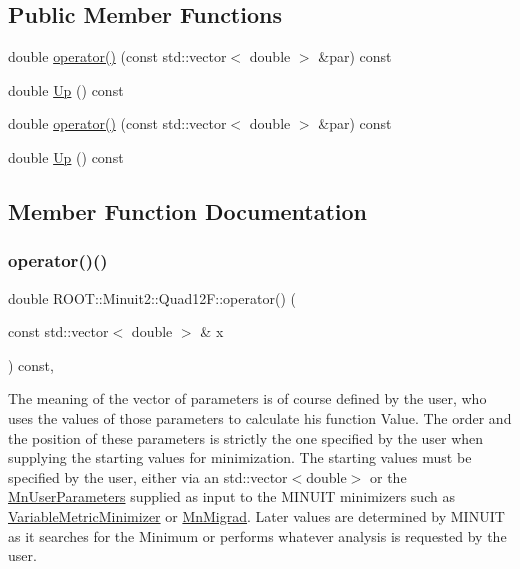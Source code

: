 \subsection*{Public Member Functions}
\begin{DoxyCompactItemize}
\item 
double \mbox{\hyperlink{classROOT_1_1Minuit2_1_1Quad12F_ad68fa5e48b2de950139a1e73a5a0558b}{operator()}} (const std\+::vector$<$ double $>$ \&par) const
\item 
double \mbox{\hyperlink{classROOT_1_1Minuit2_1_1Quad12F_afbb216349fbceafc530845fe1cff5af4}{Up}} () const
\item 
double \mbox{\hyperlink{classROOT_1_1Minuit2_1_1Quad12F_ad68fa5e48b2de950139a1e73a5a0558b}{operator()}} (const std\+::vector$<$ double $>$ \&par) const
\item 
double \mbox{\hyperlink{classROOT_1_1Minuit2_1_1Quad12F_afbb216349fbceafc530845fe1cff5af4}{Up}} () const
\end{DoxyCompactItemize}


\subsection{Member Function Documentation}
\mbox{\label{classROOT_1_1Minuit2_1_1Quad12F_ad68fa5e48b2de950139a1e73a5a0558b}} 
\subsubsection{\texorpdfstring{operator()()}{operator()()}\hspace{0.1cm}{\footnotesize\ttfamily [1/2]}}
{\footnotesize\ttfamily double R\+O\+O\+T\+::\+Minuit2\+::\+Quad12\+F\+::operator() (\begin{DoxyParamCaption}\item[{const std\+::vector$<$ double $>$ \&}]{x }\end{DoxyParamCaption}) const\hspace{0.3cm}{\ttfamily [inline]}, {\ttfamily [virtual]}}

The meaning of the vector of parameters is of course defined by the user, who uses the values of those parameters to calculate his function Value. The order and the position of these parameters is strictly the one specified by the user when supplying the starting values for minimization. The starting values must be specified by the user, either via an std\+::vector$<$double$>$ or the \mbox{\hyperlink{classROOT_1_1Minuit2_1_1MnUserParameters}{Mn\+User\+Parameters}} supplied as input to the M\+I\+N\+U\+IT minimizers such as \mbox{\hyperlink{classROOT_1_1Minuit2_1_1VariableMetricMinimizer}{Variable\+Metric\+Minimizer}} or \mbox{\hyperlink{classROOT_1_1Minuit2_1_1MnMigrad}{Mn\+Migrad}}. Later values are determined by M\+I\+N\+U\+IT as it searches for the Minimum or performs whatever analysis is requested by the user.


